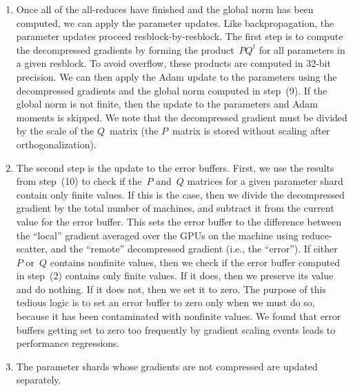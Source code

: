 \documentclass{article}
\begin{document}
\begin{enumerate}
    \item Once all of the all-reduces have finished and the global norm has been computed, we can apply the parameter updates. Like backpropagation, the parameter updates proceed resblock-by-resblock. The first step is to compute the decompressed gradients by forming the product~$PQ^t$ for all parameters in a given resblock. To avoid overflow, these products are computed in 32-bit precision. We can then apply the Adam update to the parameters using the decompressed gradients and the global norm computed in step~(9). If the global norm is not finite, then the update to the parameters and Adam moments is skipped. We note that the decompressed gradient must be divided by the scale of the $Q$~matrix (the $P$~matrix is stored without scaling after orthogonalization).
    \item The second step is the update to the error buffers. First, we use the results from step~(10) to check if the~$P$ and~$Q$ matrices for a given parameter shard contain only finite values. If this is the case, then we divide the decompressed gradient by the total number of machines, and subtract it from the current value for the error buffer. This sets the error buffer to the difference between the ``local'' gradient averaged over the GPUs on the machine using reduce-scatter, and the ``remote'' decompressed gradient (i.e., the ``error''). If either~$P$ or~$Q$ contains nonfinite values, then we check if the error buffer computed in step~(2) contains only finite values. If it does, then we preserve its value and do nothing. If it does not, then we set it to zero. The purpose of this tedious logic is to set an error buffer to zero only when we must do so, because it has been contaminated with nonfinite values. We found that error buffers getting set to zero too frequently by gradient scaling events leads to performance regressions.
    \item The parameter shards whose gradients are not compressed are updated separately.
\end{enumerate}
\end{document}
